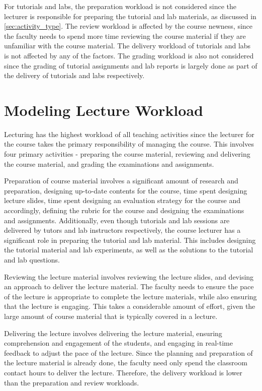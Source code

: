 For tutorials and labs, the preparation workload is not considered since the lecturer is responsible for preparing the tutorial and lab materials, as discussed in \autoref{sec:activity_type}. The review workload is affected by the course newness, since the faculty needs to spend more time reviewing the course material if they are unfamiliar with the course material. The delivery workload of tutorials and labs is not affected by any of the factors. The grading workload is also not considered since the grading of tutorial assignments and lab reports is largely done as part of the delivery of tutorials and labs respectively.

\section{Modeling Lecture Workload}

Lecturing has the highest workload of all teaching activities since the lecturer for the course takes the primary responsibility of managing the course. This involves four primary activities - preparing the course material, reviewing and delivering the course material, and grading the examinations and assignments.

Preparation of course material involves a significant amount of research and preparation, designing up-to-date contents for the course, time spent designing lecture slides, time spent designing an evaluation strategy for the course and accordingly, defining the rubric for the course and designing the examinations and assignments. Additionally, even though tutorials and lab sessions are delivered by tutors and lab instructors respectively, the course lecturer has a significant role in preparing the tutorial and lab material. This includes designing the tutorial material and lab experiments, as well as the solutions to the tutorial and lab questions.

Reviewing the lecture material involves reviewing the lecture slides, and devising an approach to deliver the lecture material. The faculty needs to ensure the pace of the lecture is appropriate to complete the lecture materials, while also ensuring that the lecture is engaging. This takes a considerable amount of effort, given the large amount of course material that is typically covered in a lecture.

Delivering the lecture involves delivering the lecture material, ensuring comprehension and engagement of the students, and engaging in real-time feedback to adjust the pace of the lecture. Since the planning and preparation of the lecture material is already done, the faculty need only spend the classroom contact hours to deliver the lecture. Therefore, the delivery workload is lower than the preparation and review workloads.

